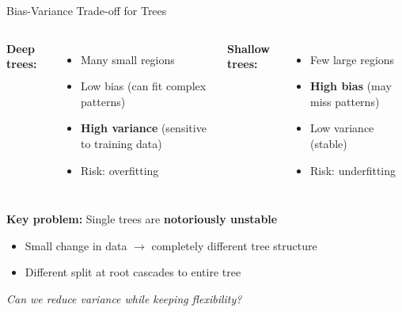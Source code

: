 \documentclass[10pt]{beamer}
\newcommand{\highlight}[1]{\textcolor{AccentOrange}{\textbf{#1}}}
\begin{document}
\begin{frame}{Bias-Variance Trade-off for Trees}

  \begin{columns}[T]
    \textbf{Deep trees:}
    \begin{itemize}
      \item Many small regions
      \item Low bias (can fit complex patterns)
      \item \highlight{High variance} (sensitive to training data)
      \item Risk: overfitting
    \end{itemize}

    \textbf{Shallow trees:}
    \begin{itemize}
      \item Few large regions
      \item \highlight{High bias} (may miss patterns)
      \item Low variance (stable)
      \item Risk: underfitting
    \end{itemize}
  \end{columns}

  \vspace{2em}
  \textbf{Key problem:} Single trees are \highlight{notoriously unstable}
  \begin{itemize}
    \item Small change in data $\rightarrow$ completely different tree structure
    \item Different split at root cascades to entire tree
  \end{itemize}

  \vspace{0.5em}
  \centering
  \textit{Can we reduce variance while keeping flexibility?}
\end{frame}
\end{document}
